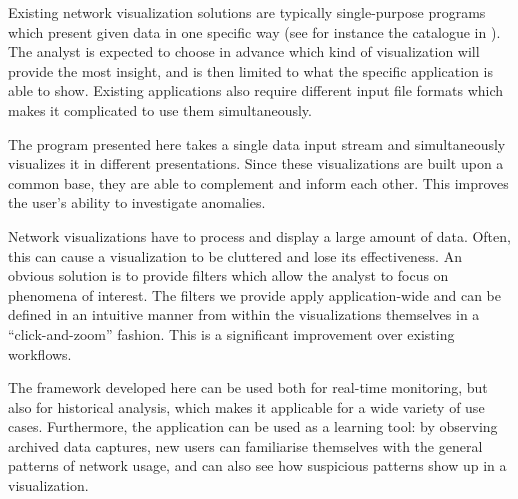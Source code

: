 Existing network visualization solutions are typically single-purpose programs which present given data in one specific way (see for instance the catalogue in \cite{marty2009applied}). The analyst is expected to choose in advance which kind of visualization will provide the most insight, and is then limited to what the specific application is able to show. Existing applications also require different input file formats which makes it complicated to use them simultaneously. %

The program presented here takes a single data input stream and simultaneously visualizes it in different presentations. Since these visualizations are built upon a common base, they are able to complement and inform each other. This improves the user's ability to investigate anomalies.

Network visualizations have to process and display a large amount of data. Often, this can cause a visualization to be cluttered and lose its effectiveness. An obvious solution is to provide filters which allow the analyst to focus on phenomena of interest. The filters we provide apply application-wide and can be defined in an intuitive manner from within the visualizations themselves in a ``click-and-zoom'' fashion. This is a significant improvement over existing workflows.

The framework developed here can be used both for real-time monitoring, but also for historical analysis, which makes it applicable for a wide variety of use cases. Furthermore, the application can be used as a learning tool: by observing archived data captures, new users can familiarise themselves with the general patterns of network usage, and can also see how suspicious patterns show up in a visualization.